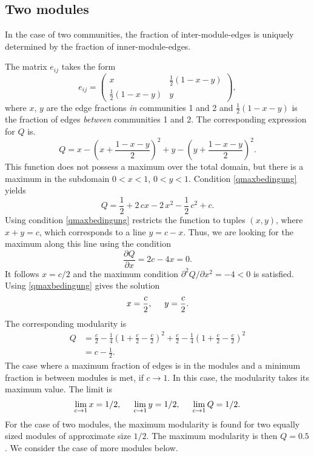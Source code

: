 \subsection{Two modules}
In the case of two communities, the fraction of inter-module-edges is uniquely determined by the fraction of inner-module-edges.

The matrix $e_{ij}$ takes the form
\[
e_{ij}=\left(\begin{array}{cc}x & \frac{1}{2}(1-x-y) \\ \frac{1}{2}(1-x-y) & y\end{array}\right) ,
\]
where $x$, $y$ are the edge fractions \emph{in} communities 1 and 2 and $\frac{1}{2}(1-x-y)$ is the fraction of edges \emph{between} communities 1 and 2.
The corresponding expression for $Q$ is.
\[
Q=x-\left( x+\frac{1-x-y}{2} \right) ^2 +y -\left( y+\frac{1-x-y}{2} \right) ^2 .
\]
This function does not possess a maximum over the total domain, but there is a maximum in the subdomain $0<x<1$, $ 0<y<1$.
Condition \eqref{qmaxbedingung} yields
\[
Q=\frac{1}{2}+2\, cx-2\, x^2-\frac{1}{2}\, c^2+c.
\]
Using condition \eqref{qmaxbedingung} restricts the function to tuples $(x,y)$, where $x+y=c$, which corresponds to a line $y=c-x$.
Thus, we are looking for the maximum along this line using the condition
\[
\frac{\partial Q}{\partial x}=2c-4x=0.
\]
It follows $x=c/2$ and the maximum condition $\partial ^2 Q/\partial x^2 =-4<0$ is satisfied.
Using \eqref{qmaxbedingung} gives the solution
\begin{equation}\label{qmax_xy}
x=\frac{c}{2} , \hspace{0.5cm} y=\frac{c}{2}.
\end{equation}
The corresponding modularity is 
\begin{align*}
Q&=\frac{c}{2}-\frac{1}{4}\left( 1+\frac{c}{2}-\frac{c}{2} \right) ^2 +\frac{c}{2}-\frac{1}{4}\left( 1+\frac{c}{2}-\frac{c}{2} \right) ^2 \\
&= c- \frac{1}{2} .
\end{align*}
The case where a maximum fraction of edges is in the modules and a minimum fraction is between modules is met, if $c\rightarrow 1$.
In this case, the modularity takes its maximum value.
The limit is
\begin{equation}\label{q2limits}
\lim _{c\rightarrow 1} x =1/2, \hspace{0.5cm}\lim _{c\rightarrow 1} y =1/2, \hspace{0.5cm} \lim _{c\rightarrow 1} Q=1/2.
\end{equation}
For the case of two modules, the maximum modularity is found for two equally sized modules of approximate size $1/2$.
The maximum modularity is then $Q=0.5$.
We consider the case of more modules below.

